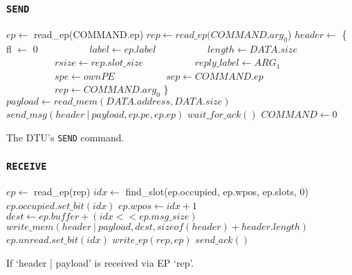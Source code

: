 \documentclass[a4paper,11pt,draft]{article}
\begin{document}
\subsubsection{\texttt{SEND}}

\begin{algorithm}[H]
    $ep \gets$ read\_ep(COMMAND.ep)\;
    \BlankLine
    $rep \gets read\_ep(COMMAND.arg_0$)\;
    $header \gets$ \{ fl $\gets$ 0\;
    $\quad\quad\quad\quad\quad label \gets ep.label$\;
    $\quad\quad\quad\quad\quad length \gets DATA.size$\;
    $\quad\quad\quad\quad\quad rsize \gets rep.slot\_size$\;
    $\quad\quad\quad\quad\quad reply\_label \gets ARG_1$\;
    $\quad\quad\quad\quad\quad spe \gets ownPE$\;
    $\quad\quad\quad\quad\quad sep \gets COMMAND.ep$\;
    $\quad\quad\quad\quad\quad rep \gets COMMAND.arg_0$ \}\;
    $payload \gets read\_mem(DATA.address, DATA.size)$\;
    $send\_msg(header\ |\ payload, ep.pe, ep.ep)$\;
    $wait\_for\_ack()$\;
    \BlankLine
    $COMMAND \gets 0$\;
    \caption{The DTU's \texttt{SEND} command.}
\end{algorithm}

\subsubsection{\texttt{RECEIVE}}

\begin{algorithm}[H]
    $ep \gets$ read\_ep(rep)\;
    \BlankLine
    $idx \gets$ find\_slot(ep.occupied, ep.wpos, ep.slots, 0)\;
    $ep.occupied.set\_bit(idx)$\;
    $ep.wpos \gets idx + 1$\;
    \BlankLine
    $dest \gets ep.buffer + (idx << ep.msg\_size)$\;
    $write\_mem(header\ |\ payload, dest, sizeof(header) + header.length)$\;
    $ep.unread.set\_bit(idx)$\;
    $write\_ep(rep, ep)$\;
    \BlankLine
    $send\_ack()$\;
    \caption{If `header | payload' is received via EP `rep'.}
\end{algorithm}
\end{document}
